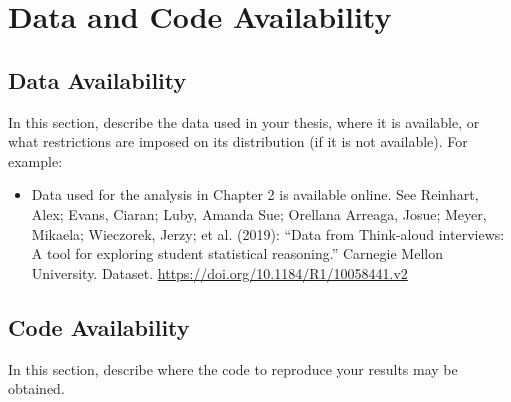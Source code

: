 \chapter{Data and Code Availability}

\section{Data Availability}

In this section, describe the data used in your thesis, where it is available,
or what restrictions are imposed on its distribution (if it is not available).
For example:
\begin{itemize}
\item Data used for the analysis in Chapter 2 is available online. See Reinhart,
  Alex; Evans, Ciaran; Luby, Amanda Sue; Orellana Arreaga, Josue; Meyer,
  Mikaela; Wieczorek, Jerzy; et al. (2019): ``Data from Think-aloud interviews:
  A tool for exploring student statistical reasoning.'' Carnegie Mellon
  University. Dataset. \url{https://doi.org/10.1184/R1/10058441.v2}
\end{itemize}

\section{Code Availability}

In this section, describe where the code to reproduce your results may be
obtained.
